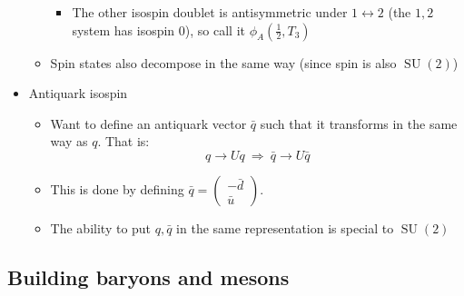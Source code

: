 \documentclass[11pt]{article}
\newcommand{\ubar}{\bar{u}}
\newcommand{\qbar}{{\bar{q}}}
\newcommand{\dbar}{\bar{d}}
\DeclareMathOperator{\SU}{SU}
\newcommand{\thus}{\ensuremath{~\Rightarrow~}}
\begin{document}
\begin{itemize}
\begin{itemize}
\begin{itemize}
      \item The other isospin doublet is antisymmetric under $1\leftrightarrow2$ (the $1,2$ system has isospin $0$), so call it $\phi_A\left(\frac{1}{2},T_3\right)$
    \end{itemize}
    \item Spin states also decompose in the same way (since spin is also $\SU(2)$)
  \end{itemize}
  \item Antiquark isospin
  \begin{itemize}
    \item Want to define an antiquark vector $\qbar$ such that it transforms in the same way as $q$. That is:
    \begin{equation}
      q \rightarrow U q \thus \qbar \rightarrow U \qbar
    \end{equation}
    \item This is done by defining $\qbar = \begin{pmatrix} - \dbar \\ \ubar \end{pmatrix}$.
    \item The ability to put $q,\qbar$ in the same representation is special to $\SU(2)$
  \end{itemize}
\end{itemize}

\subsection{Building baryons and mesons}
\end{document}
